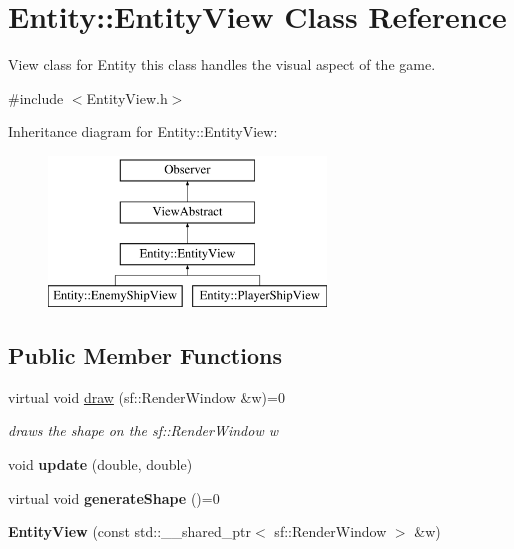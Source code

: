 \hypertarget{classEntity_1_1EntityView}{}\section{Entity\+:\+:Entity\+View Class Reference}
\label{classEntity_1_1EntityView}


View class for Entity this class handles the visual aspect of the game.  




{\ttfamily \#include $<$Entity\+View.\+h$>$}

Inheritance diagram for Entity\+:\+:Entity\+View\+:\begin{figure}[H]
\begin{center}
\leavevmode
\includegraphics[height=4.000000cm]{classEntity_1_1EntityView}
\end{center}
\end{figure}
\subsection*{Public Member Functions}
\begin{DoxyCompactItemize}
\item 
virtual void \hyperlink{classEntity_1_1EntityView_a9a415b467798f8bbb9cd2489c3edd941}{draw} (sf\+::\+Render\+Window \&w)=0
\begin{DoxyCompactList}\small\item\em draws the shape on the sf\+::\+Render\+Window w \end{DoxyCompactList}\item 
\mbox{\label{classEntity_1_1EntityView_aa7ac759577e903d916b7f62e81acfc39}} 
void {\bfseries update} (double, double)
\item 
\mbox{\label{classEntity_1_1EntityView_ae4aeb4a57034976467848d12906d3042}} 
virtual void {\bfseries generate\+Shape} ()=0
\item 
\mbox{\label{classEntity_1_1EntityView_a39b187a6aee5645e3fee90cffa65ccc1}} 
{\bfseries Entity\+View} (const std\+::\+\_\+\+\_\+shared\+\_\+ptr$<$ sf\+::\+Render\+Window $>$ \&w)
\end{DoxyCompactItemize}
